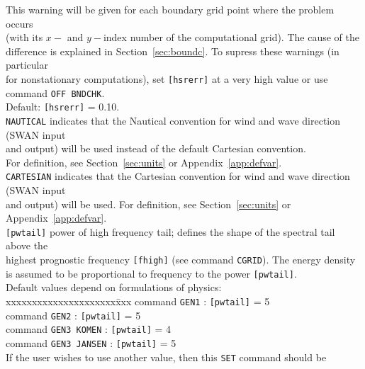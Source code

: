 \documentclass[12pt]{book}
\begin{document}
\begin{tabbing}
                   This warning will be given for each boundary grid point where the problem occurs\\
                   (with its $x-$ and $y-$index number of the computational grid). The cause of the\\
                   difference is explained in Section~\ref{sec:boundc}. To supress these warnings (in particular\\
                   for nonstationary computations), set {\tt [hsrerr]} at a very high value or use\\
                   command {\tt OFF BNDCHK}.\\
                   Default: {\tt [hsrerr]} = 0.10.\-\\
{\tt NAUTICAL}  \> indicates that the Nautical convention for wind and wave direction (SWAN input\+\\
                   and output) will be used instead of the default Cartesian convention.\\
                   For definition, see Section~\ref{sec:units} or Appendix~\ref{app:defvar}.\-\\
{\tt CARTESIAN} \> indicates that the Cartesian convention for wind and wave direction (SWAN input\+\\
                   and output) will be used. For definition, see Section~\ref{sec:units} or Appendix~\ref{app:defvar}.\-\\
{\tt [pwtail]}  \> power of high frequency tail; defines the shape of the spectral tail above the\+\\
                   highest prognostic frequency {\tt [fhigh]} (see command {\tt CGRID}). The energy density\\
                   is assumed to be proportional to frequency to the power {\tt [pwtail]}.\\
                   Default values depend on formulations of physics:\\
                   \pushtabs
                   xxxxxxxxxxxxxxxxxxxxx\=xxx \kill
                   command {\tt GEN1}        \>: {\tt [pwtail]} = 5\\
                   command {\tt GEN2}        \>: {\tt [pwtail]} = 5\\
                   command {\tt GEN3 KOMEN}  \>: {\tt [pwtail]} = 4\\
                   command {\tt GEN3 JANSEN} \>: {\tt [pwtail]} = 5\\
                   \poptabs
                   If the user wishes to use another value, then this {\tt SET} command should be\\

\end{tabbing}
\end{document}
